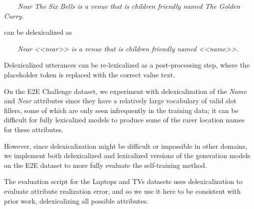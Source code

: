 \begin{center}\noindent~~~~\textit{Near The Six Bells is a venue that is children
friendly named The Golden Curry.}\end{center}

\noindent can be delexicalized as

\begin{center}\noindent ~~~~\textit{Near <<near>> is a venue that is children
friendly named <<name>>.}\end{center}

\noindent Delexicalized utterances can be re-lexicalized as a post-processing
step, where the placeholder token is replaced with the correct value text.

On the E2E Challenge dataset, we experiment with delexicalization of the 
\textit{Name} and \textit{Near} attributes since they have a relatively large vocabulary of valid slot fillers, some of which are only seen  infrequently in the training data;
it can be difficult for fully lexicalized models to produce some of the 
rarer location names for these attributes. 

However, since delexicalization might be difficult or 
impossible in other domains, we implement both delexicalized and lexicalized
versions of the generation models on the E2E dataset to 
more fully evaluate the
self-training method.
   

The evaluation script for the Laptops and TVs datasets uses delexicalization
to evaluate attribute realization error, and so we use it here to be 
consistent with prior work, 
delexicalizing all possible attributes.
%



